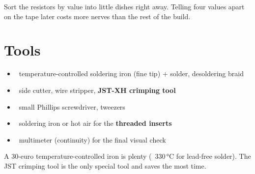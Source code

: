 \begin{schmunzel}
Sort the resistors by value into little dishes right away. Telling four values apart on the
tape later costs more nerves than the rest of the build.
\end{schmunzel}

\clearpage
\section{Tools}
\begin{itemize}[leftmargin=8mm,itemsep=2pt]
  \item \faBolt\ temperature-controlled soldering iron (fine tip) + solder, desoldering braid
  \item \faCut\ side cutter, wire stripper, \textbf{JST-XH crimping tool}
  \item \faScrewdriver\ small Phillips screwdriver, tweezers
  \item \faFire\ soldering iron or hot air for the \textbf{threaded inserts}
  \item \faSearch\ multimeter (continuity) for the final visual check
\end{itemize}
\begin{tipp}
A 30-euro temperature-controlled iron is plenty (~330\,°C for lead-free solder). The JST
crimping tool is the only special tool and saves the most time.
\end{tipp}

\clearpage
